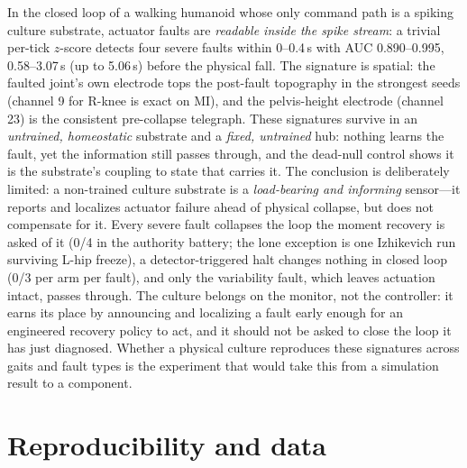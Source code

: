 In the closed loop of a walking humanoid whose only command path is a spiking
culture substrate, actuator faults are \emph{readable inside the spike stream}:
a trivial per-tick $z$-score detects four severe faults within 0--0.4\,s with
AUC 0.890--0.995, 0.58--3.07\,s (up to 5.06\,s) before the physical fall. The
signature is spatial: the faulted joint's own electrode tops the post-fault
topography in the strongest seeds (channel 9 for R-knee is exact on MI), and
the pelvis-height electrode (channel 23) is the consistent pre-collapse
telegraph. These signatures survive in an \emph{untrained, homeostatic}
substrate and a \emph{fixed, untrained} hub: nothing learns the fault, yet the
information still passes through, and the dead-null control shows it is the
substrate's coupling to state that carries it. The conclusion is deliberately
limited: a non-trained culture substrate is a \emph{load-bearing and informing}
sensor---it reports and localizes actuator failure ahead of physical collapse,
but does not compensate for it. Every severe fault collapses the loop the
moment recovery is asked of it (0/4 in the authority battery; the lone
exception is one Izhikevich run surviving L-hip freeze), a detector-triggered
halt changes nothing in closed loop (0/3 per arm per fault), and only the
variability fault, which leaves actuation intact, passes through. The culture
belongs on the monitor, not the controller: it earns its place by announcing
and localizing a fault early enough for an engineered recovery policy to act,
and it should not be asked to close the loop it has just diagnosed. Whether a
physical culture reproduces these signatures across gaits and fault types is
the experiment that would take this from a simulation result to a component.

\section*{Reproducibility and data}

